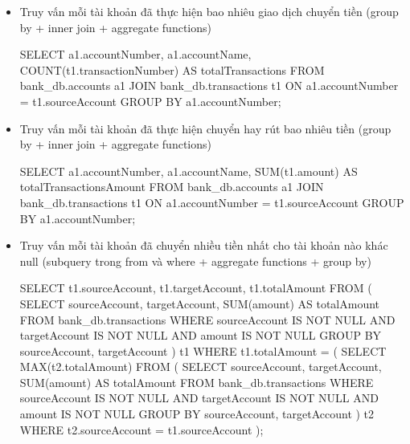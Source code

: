 \begin{itemize}

    \item Truy vấn mỗi tài khoản đã thực hiện bao nhiêu giao dịch chuyển tiền (group by + inner join + aggregate functions)
    \begin{MySQLCode}
    SELECT 
        a1.accountNumber,
        a1.accountName,
        COUNT(t1.transactionNumber) AS totalTransactions
    FROM 
        bank_db.accounts a1
    JOIN 
        bank_db.transactions t1 ON a1.accountNumber = t1.sourceAccount
    GROUP BY 
        a1.accountNumber;
    \end{MySQLCode}

    \item Truy vấn mỗi tài khoản đã thực hiện chuyển hay rút bao nhiêu tiền (group by + inner join + aggregate functions)
    \begin{MySQLCode}
    SELECT 
        a1.accountNumber,
        a1.accountName,
        SUM(t1.amount) AS totalTransactionsAmount
    FROM 
        bank_db.accounts a1
    JOIN 
        bank_db.transactions t1 ON a1.accountNumber = t1.sourceAccount
    GROUP BY 
        a1.accountNumber;
    \end{MySQLCode}

    \item Truy vấn mỗi tài khoản đã chuyển nhiều tiền nhất cho tài khoản nào khác null (subquery trong from và where + aggregate functions + group by)
    \begin{MySQLCode}
    SELECT 
        t1.sourceAccount, 
        t1.targetAccount, 
        t1.totalAmount
    FROM (
        SELECT 
            sourceAccount, 
            targetAccount, 
            SUM(amount) AS totalAmount
        FROM 
            bank_db.transactions
        WHERE 
            sourceAccount IS NOT NULL 
            AND targetAccount IS NOT NULL 
            AND amount IS NOT NULL
        GROUP BY 
            sourceAccount, targetAccount
    ) t1
    WHERE 
        t1.totalAmount = (
            SELECT 
                MAX(t2.totalAmount)
            FROM (
                SELECT 
                    sourceAccount, 
                    targetAccount, 
                    SUM(amount) AS totalAmount
                FROM 
                    bank_db.transactions
                WHERE 
                    sourceAccount IS NOT NULL 
                    AND targetAccount IS NOT NULL 
                    AND amount IS NOT NULL
                GROUP BY 
                    sourceAccount, targetAccount
            ) t2
            WHERE 
                t2.sourceAccount = t1.sourceAccount
        );
    \end{MySQLCode}


\end{itemize}

